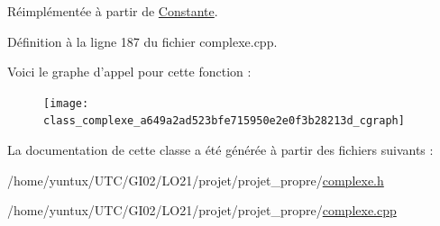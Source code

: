 \-Réimplémentée à partir de \hyperlink{class_constante_a6f5f971e61ac831355f1182289c3952f}{\-Constante}.



\-Définition à la ligne 187 du fichier complexe.\-cpp.



\-Voici le graphe d'appel pour cette fonction \-:\nopagebreak
\begin{figure}[H]
\begin{center}
\leavevmode
\texttt{[image: class\_complexe\_a649a2ad523bfe715950e2e0f3b28213d\_cgraph]}
\end{center}
\end{figure}




\-La documentation de cette classe a été générée à partir des fichiers suivants \-:\begin{DoxyCompactItemize}
\item 
/home/yuntux/\-U\-T\-C/\-G\-I02/\-L\-O21/projet/projet\-\_\-propre/\hyperlink{complexe_8h}{complexe.\-h}\item 
/home/yuntux/\-U\-T\-C/\-G\-I02/\-L\-O21/projet/projet\-\_\-propre/\hyperlink{complexe_8cpp}{complexe.\-cpp}\end{DoxyCompactItemize}
